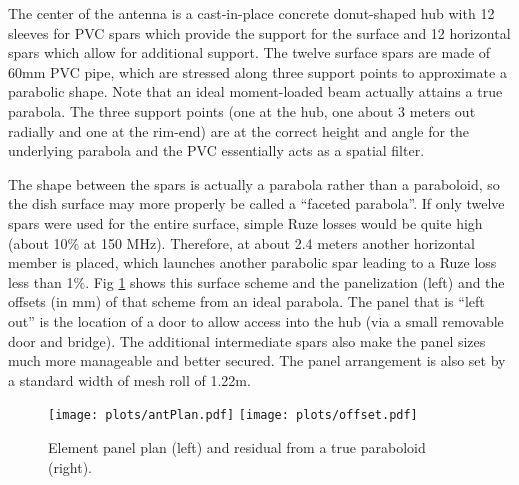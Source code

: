 \documentclass[preprint,11pt]{aastex}
\begin{document}
The center of the antenna is a cast-in-place concrete donut-shaped hub with 12 sleeves for PVC spars which provide the support for the surface and 12 horizontal spars which allow for additional support.  The twelve surface spars are made of 60mm PVC pipe, which are stressed along three support points to approximate a parabolic shape.  Note that an ideal moment-loaded beam actually attains a true parabola.  The three support points (one at the hub, one about 3 meters out radially and one at the rim-end) are at the correct height and angle for the underlying parabola and the PVC essentially acts as a spatial filter.

The shape between the spars is actually a parabola rather than a paraboloid, so the dish surface may more properly be called a ``faceted parabola''.  If only twelve spars were used for the entire surface, simple Ruze losses would be quite high (about 10\% at 150 MHz).  Therefore, at about 2.4 meters another horizontal member is placed, which launches another parabolic spar leading to a Ruze loss less than 1\%.  Fig \ref{fig:elementplan} shows this surface scheme and the panelization (left) and the offsets (in mm) of that scheme from an ideal parabola.  The panel that is ``left out'' is the location of a door to allow access into the hub (via a small removable door and bridge).  The additional intermediate spars also make the panel sizes much more manageable and better secured.  The panel arrangement is also set by a standard width of mesh roll of 1.22m.

\begin{figure}[h!]
\centerline{
\texttt{[image: plots/antPlan.pdf]}
\texttt{[image: plots/offset.pdf]} 
}
\caption{\small Element panel plan (left) and residual from a true paraboloid (right).
\label{fig:elementplan}}
\end{figure}
\end{document}
